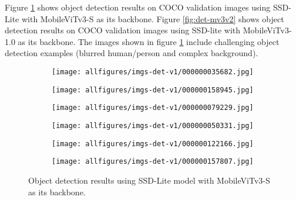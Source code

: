 \documentclass{article} \usepackage{iclr2022_conference,times}
\begin{document}
Figure \ref{fig:det-mv3v1} shows object detection results on COCO validation images using SSD-Lite with MobileViTv3-S as its backbone.
Figure \ref{fig:det-mv3v2} shows object detection results on COCO validation images using SSD-lite with MobileViTv3-1.0 as its backbone.
The images shown in figure \ref{fig:det-mv3v1} include challenging object detection examples (blurred human/person and complex background).


\begin{figure}[ht]
\centering
\begin{subfigure}{.5\textwidth}
  \centering
  \texttt{[image: allfigures/imgs-det-v1/000000035682.jpg]}
\end{subfigure}\hfil
\begin{subfigure}{.5\textwidth}
  \centering
  \texttt{[image: allfigures/imgs-det-v1/000000158945.jpg]}
\end{subfigure}\hfil


\vspace{0.5cm}

\begin{subfigure}{.5\textwidth}
  \centering
  \texttt{[image: allfigures/imgs-det-v1/000000079229.jpg]}
\end{subfigure}\hfil
\begin{subfigure}{.5\textwidth}
  \centering
  \texttt{[image: allfigures/imgs-det-v1/000000050331.jpg]}
\end{subfigure}\hfil

\vspace{0.5cm}


\begin{subfigure}{.5\textwidth}
  \centering
  \texttt{[image: allfigures/imgs-det-v1/000000122166.jpg]}
\end{subfigure}\hfil
\begin{subfigure}{.5\textwidth}
  \centering
  \texttt{[image: allfigures/imgs-det-v1/000000157807.jpg]}
\end{subfigure}\hfil
\caption{Object detection results using SSD-Lite model with MobileViTv3-S as its backbone.}
\label{fig:det-mv3v1}
\end{figure}
\end{document}
